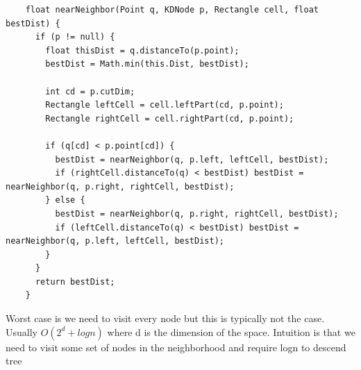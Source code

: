 \documentclass{article}
\begin{document}
  \begin{lstlisting}
    float nearNeighbor(Point q, KDNode p, Rectangle cell, float bestDist) {
      if (p != null) {
        float thisDist = q.distanceTo(p.point);
        bestDist = Math.min(this.Dist, bestDist);

        int cd = p.cutDim;
        Rectangle leftCell = cell.leftPart(cd, p.point);
        Rectangle rightCell = cell.rightPart(cd, p.point);

        if (q[cd] < p.point[cd]) {
          bestDist = nearNeighbor(q, p.left, leftCell, bestDist);
          if (rightCell.distanceTo(q) < bestDist) bestDist = nearNeighbor(q, p.right, rightCell, bestDist);
        } else {
          bestDist = nearNeighbor(q, p.right, rightCell, bestDist);
          if (leftCell.distanceTo(q) < bestDist) bestDist = nearNeighbor(q, p.left, leftCell, bestDist);
        }
      }
      return bestDist;
    }
  \end{lstlisting}
  Worst case is we need to visit every node but this is typically not the case. Usually $O(2^{d} + logn)$ where d is the dimension of the space. Intuition is that we need to visit some set of nodes in the neighborhood and require logn to descend tree
\end{document}
